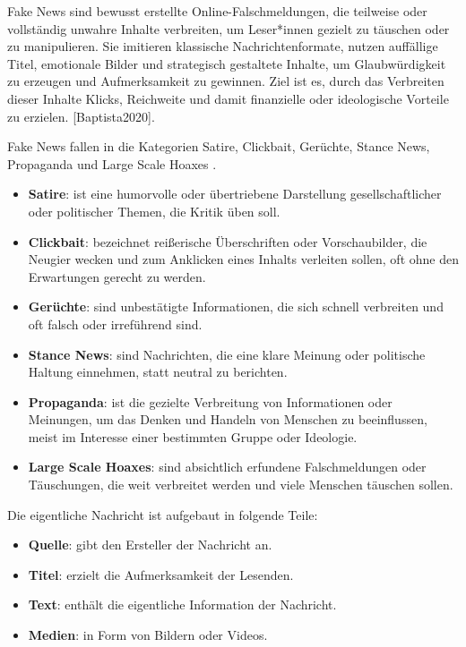 Fake News sind bewusst erstellte Online-Falschmeldungen, die teilweise oder vollständig unwahre Inhalte verbreiten, 
um Leser*innen gezielt zu täuschen oder zu manipulieren. Sie imitieren klassische Nachrichtenformate, nutzen auﬀällige Titel, emotionale Bilder und strategisch gestaltete
Inhalte, um Glaubwürdigkeit zu erzeugen und Aufmerksamkeit zu gewinnen. Ziel ist es, durch das Verbreiten dieser Inhalte Klicks, Reichweite und damit finanzielle oder ideologische Vorteile zu
erzielen. [Baptista2020].

Fake News fallen in die Kategorien Satire, Clickbait, Gerüchte, Stance News, Propaganda und Large Scale Hoaxes \cite{Sharma:2024}.

\begin{itemize}
    \item \textbf{Satire}: ist eine humorvolle oder übertriebene Darstellung gesellschaftlicher oder politischer Themen, die Kritik üben soll.
    \item \textbf{Clickbait}: bezeichnet reißerische Überschriften oder Vorschaubilder, die Neugier wecken und zum Anklicken eines Inhalts verleiten sollen, oft ohne den Erwartungen gerecht zu werden.
    \item \textbf{Gerüchte}: sind unbestätigte Informationen, die sich schnell verbreiten und oft falsch oder irreführend sind.
    \item \textbf{Stance News}: sind Nachrichten, die eine klare Meinung oder politische Haltung einnehmen, statt neutral zu berichten.
    \item \textbf{Propaganda}: ist die gezielte Verbreitung von Informationen oder Meinungen, um das Denken und Handeln von Menschen zu beeinflussen, meist im Interesse einer bestimmten Gruppe oder Ideologie.
    \item \textbf{Large Scale Hoaxes}: sind absichtlich erfundene Falschmeldungen oder Täuschungen, die weit verbreitet werden und viele Menschen täuschen sollen.
\end{itemize}

Die eigentliche Nachricht ist aufgebaut in folgende Teile:

\begin{itemize}
    \item \textbf{Quelle}: gibt den Ersteller der Nachricht an.
    \item \textbf{Titel}: erzielt die Aufmerksamkeit der Lesenden.
    \item \textbf{Text}: enthält die eigentliche Information der Nachricht.
    \item \textbf{Medien}: in Form von Bildern oder Videos.
\end{itemize}

